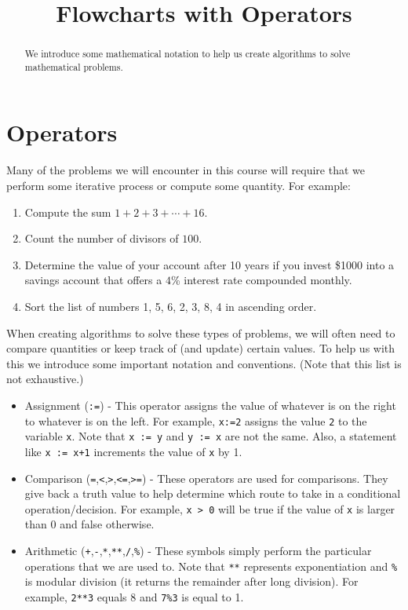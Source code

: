 \documentclass{ximera}
\title{Flowcharts with Operators}
\begin{document}
  
\begin{abstract}  
We introduce some mathematical notation to help us create algorithms to solve mathematical problems. 
\end{abstract}  
\maketitle

\section{Operators}
Many of the problems we will encounter in this course will require that we perform some iterative process or compute some quantity. For example:

\begin{enumerate}
	\item Compute the sum $1+2+3+\cdots+16$.
	\item Count the number of divisors of $100$.
	\item Determine the value of your account after 10 years if you invest \$1000 into a savings account that offers a $4$\% interest rate compounded monthly.
	\item Sort the list of numbers 1, 5, 6, 2, 3, 8, 4 in ascending order.
\end{enumerate}

When creating algorithms to solve these types of problems, we will often need to compare quantities or keep track of (and update) certain values. To help us with this we introduce some important notation and conventions. (Note that this list is not exhaustive.)

\begin{itemize}
	\item Assignment (\verb|:=|) - This operator assigns the value of whatever is on the right to whatever is on the left. For example, \verb|x:=2| assigns the value \verb|2| to the variable \verb|x|. Note that \verb|x := y| and \verb|y := x| are not the same. Also, a statement like \verb|x := x+1| increments the value of \verb|x| by 1.
	\item Comparison (\verb|=|,\verb|<|,\verb|>|,\verb|<=|,\verb|>=|) - These operators are used for comparisons. They give back a truth value to help determine which route to take in a conditional operation/decision. For example, \verb|x > 0| will be true if the value of \verb|x| is larger than 0 and false otherwise.
		\item Arithmetic (\verb|+|,\verb|-|,\verb|*|,\verb|**|,\verb|/|,\verb|%|) - These symbols simply perform the particular operations that we are used to. Note that \verb|**| represents exponentiation and \verb|%| is modular division (it returns the remainder after long division). For example, \verb|2**3| equals 8 and \verb|7%3| is equal to 1.
\end{itemize}
\end{document}
